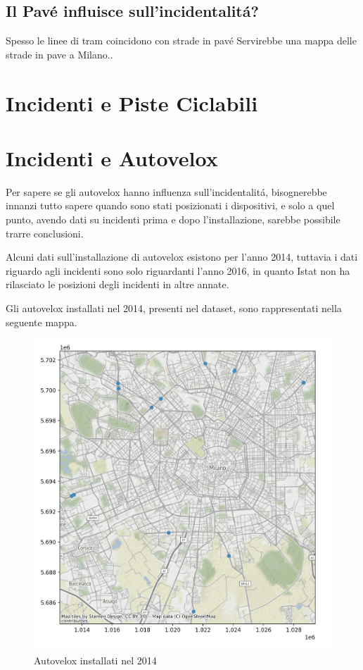 \documentclass[a4paper]{report}
\begin{document}

\newpage
\subsection{Il Pav\'e influisce sull'incidentalit\'a?} Spesso le linee di tram coincidono con
strade in pav\'e
Servirebbe una mappa delle strade in pave a Milano..

\newpage
\section{Incidenti e Piste  Ciclabili}

\newpage
\section{Incidenti e Autovelox}

Per sapere se gli autovelox hanno influenza sull'incidentalit\'a, 
bisognerebbe innanzi tutto sapere quando sono stati posizionati i dispositivi, e solo a quel punto, 
avendo dati su incidenti prima e dopo l'installazione, sarebbe possibile trarre conclusioni.

Alcuni dati sull'installazione di autovelox esistono per l'anno 2014, tuttavia i dati 
riguardo agli incidenti sono solo riguardanti l'anno 2016, in quanto Istat non ha rilasciato 
le posizioni degli incidenti in altre annate.



Gli autovelox installati nel 2014, presenti nel dataset, sono rappresentati nella seguente mappa.
\begin{figure}[!ht]
    \includegraphics[width=\linewidth]{../src/autovelox/autovelox_2014.png}
    \caption{Autovelox installati nel 2014}
    \label{fig:autovelox_2014}
\end{figure}
\end{document}
